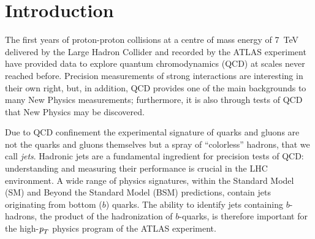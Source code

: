
\chapter{Introduction}

The first years of proton-proton collisions at a centre of mass energy of 7~TeV delivered by the Large Hadron Collider and recorded by the ATLAS experiment have provided data to
explore quantum chromodynamics (QCD) at scales never reached before. Precision measurements of strong interactions are interesting in their own right, but, in addition, QCD provides one of the main
backgrounds to many New Physics measurements; furthermore, it is also through tests of QCD
that New Physics may be discovered.

Due to QCD confinement the experimental signature of quarks and gluons are not the quarks and gluons themselves but a spray of ``colorless'' hadrons, that we call \emph{jets}.  Hadronic jets are a fundamental ingredient for precision tests of QCD: understanding and measuring their performance is crucial in the LHC environment. A wide range of physics signatures, within the Standard Model (SM) and Beyond the Standard Model (BSM) predictions, contain jets originating from bottom ($b$) quarks. 
The ability to identify jets containing $b$-hadrons, the product of the hadronization of $b$-quarks, is therefore important for the high-${\emph{p}_{T}}$ physics program of the ATLAS experiment. 

